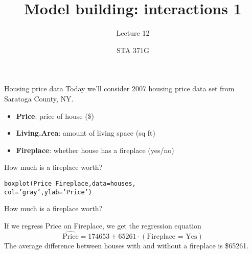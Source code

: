 \documentclass{beamer}\usepackage[]{graphicx}\usepackage[]{color}
\title{Model building: interactions 1}
\subtitle{Lecture 12}
\author{STA 371G}
\makeatletter
\newcommand{\hlstr}[1]{\textcolor[rgb]{1,0.894,0.71}{#1}}%
\newcommand{\hlopt}[1]{\textcolor[rgb]{1,0.894,0.769}{#1}}%
\newcommand{\hlstd}[1]{\textcolor[rgb]{1,0.894,0.769}{#1}}%
\newcommand{\hlkwc}[1]{\textcolor[rgb]{0.78,0.941,0.545}{#1}}%
\newcommand{\hlkwd}[1]{\textcolor[rgb]{1,0.78,0.769}{#1}}%
\newenvironment{kframe}{%
 \def\at@end@of@kframe{}%
 \ifinner\ifhmode%
  \def\at@end@of@kframe{\end{minipage}}%
  \begin{minipage}{\columnwidth}%
 \fi\fi%
 \def\FrameCommand##1{\hskip\@totalleftmargin \hskip-\fboxsep
 \colorbox{shadecolor}{##1}\hskip-\fboxsep
     \hskip-\linewidth \hskip-\@totalleftmargin \hskip\columnwidth}%
 \MakeFramed {\advance\hsize-\width
   \@totalleftmargin\z@ \linewidth\hsize
   \@setminipage}}%
 {\par\unskip\endMakeFramed%
 \at@end@of@kframe}
\newenvironment{knitrout}{}{} %
\makeatother
\begin{document}
  
  

\frame{\maketitle}



  \begin{darkframes}
    \begin{frame}{Housing price data}
      Today we'll consider 2007 housing price data set from Saratoga County, NY.
      \begin{itemize}
        \item \textbf{Price}: price of house (\$)
        \item \textbf{Living.Area}: amount of living space (sq ft)
        \item \textbf{Fireplace}: whether house has a fireplace (yes/no)
      \end{itemize}

    \end{frame}

    \begin{frame}[fragile]{How much is a fireplace worth?}
\begin{knitrout}
\begin{kframe}
\begin{alltt}
\hlkwd{boxplot}\hlstd{(Price} \hlopt{~} \hlstd{Fireplace,} \hlkwc{data}\hlstd{=houses,}
  \hlkwc{col}\hlstd{=}\hlstr{'gray'}\hlstd{,} \hlkwc{ylab}\hlstd{=}\hlstr{'Price'}\hlstd{)}
\end{alltt}
\end{kframe}


\end{knitrout}
    \end{frame}

    \begin{frame}[fragile]{How much is a fireplace worth?}
      

      If we regress Price on Fireplace, we get the regression equation
      \[
        \widehat{\text{Price}} = 174653 + 65261\cdot(\text{Fireplace = Yes})
      \]
      The average difference between houses with and without a fireplace is \$65261.


\end{frame}
\end{darkframes}
\end{document}
